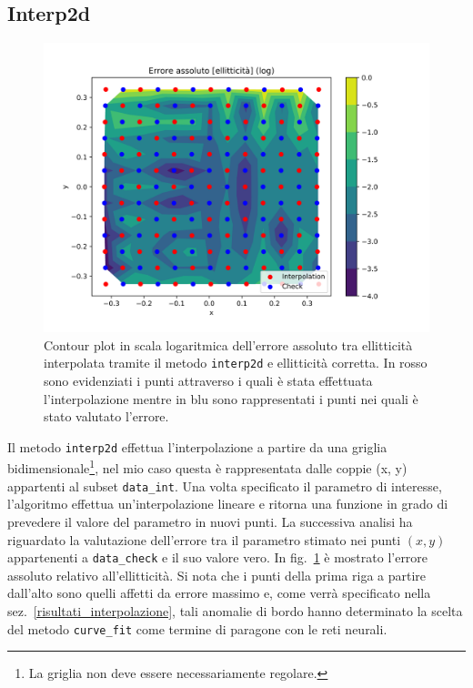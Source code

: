 \documentclass[12pt,a4paper,final]{book}
\begin{document}
\subsection{Interp2d}\label{interp2d}
\begin{figure}[t]
	\centering
	\includegraphics[scale=0.8]{../figures/errore_assoluto_ell.png}
	\caption{Contour plot in scala logaritmica dell'errore assoluto tra ellitticità interpolata tramite il metodo \texttt{interp2d} e ellitticità corretta. In rosso sono evidenziati i punti attraverso i quali è stata effettuata l'interpolazione mentre in blu sono rappresentati i punti nei quali è stato valutato l'errore.}
	\label{err_interp2d}
\end{figure}
Il metodo \texttt{interp2d} effettua l'interpolazione a partire da una griglia bidimensionale\footnote{La griglia non deve essere necessariamente regolare.}, nel mio caso questa è rappresentata dalle coppie (x, y) appartenti al subset \texttt{data\_int}. Una volta specificato il parametro di interesse, l'algoritmo effettua un'interpolazione lineare e ritorna una funzione in grado di prevedere il valore del parametro in nuovi punti.
La successiva analisi ha riguardato la valutazione dell'errore tra il parametro stimato nei punti $(x,y)$ appartenenti a \texttt{data\_check} e il suo valore vero. In fig.~\ref{err_interp2d} è mostrato l'errore assoluto relativo all'ellitticità.
Si nota che i punti della prima riga a partire dall'alto sono quelli affetti da errore massimo e, come verrà specificato nella sez.~\ref{risultati_interpolazione}, tali anomalie di bordo hanno determinato la scelta del metodo \texttt{curve\_fit} come termine di paragone con le reti neurali.
\end{document}

